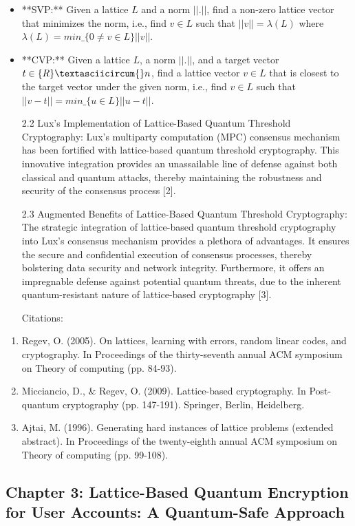 \documentclass[11pt]{article}
\begin{document}
\begin{itemize}
  \item **SVP:** Given a lattice \(L\) and a norm \(||.||\), find a non-zero lattice vector that minimizes the norm, i.e., find \(v \in L\) such that \(||v|| = \lambda(L)\) where \(\lambda(L) = min\_\{0 \neq v \in L\}||v||\).
  \item **CVP:** Given a lattice \(L\), a norm \(||.||\), and a target vector \(t \in \mathbb\{R\}\textasciicircum{}n\), find a lattice vector \(v \in L\) that is closest to the target vector under the given norm, i.e., find \(v \in L\) such that \(||v-t|| = min\_\{u \in L\}||u-t||\).

2.2 Lux's Implementation of Lattice-Based Quantum Threshold Cryptography: Lux's multiparty computation (MPC) consensus mechanism has been fortified with lattice-based quantum threshold cryptography. This innovative integration provides an unassailable line of defense against both classical and quantum attacks, thereby maintaining the robustness and security of the consensus process [2].


2.3 Augmented Benefits of Lattice-Based Quantum Threshold Cryptography: The strategic integration of lattice-based quantum threshold cryptography into Lux's consensus mechanism provides a plethora of advantages. It ensures the secure and confidential execution of consensus processes, thereby bolstering data security and network integrity. Furthermore, it offers an impregnable defense against potential quantum threats, due to the inherent quantum-resistant nature of lattice-based cryptography [3].


Citations:

\end{itemize}
\begin{enumerate}
  \item Regev, O. (2005). On lattices, learning with errors, random linear codes, and cryptography. In Proceedings of the thirty-seventh annual ACM symposium on Theory of computing (pp. 84-93).
  \item Micciancio, D., \& Regev, O. (2009). Lattice-based cryptography. In Post-quantum cryptography (pp. 147-191). Springer, Berlin, Heidelberg.
  \item Ajtai, M. (1996). Generating hard instances of lattice problems (extended abstract). In Proceedings of the twenty-eighth annual ACM symposium on Theory of computing (pp. 99-108).
\end{enumerate}

\subsection{Chapter 3: Lattice-Based Quantum Encryption for User Accounts: A Quantum-Safe Approach}
\end{document}
